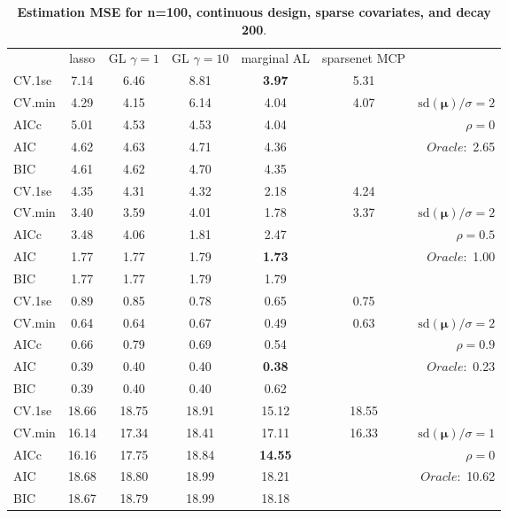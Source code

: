 \begin{table}\vspace{-.5cm}
\caption[l]{ { \bf Estimation MSE for n=100, continuous design, 
sparse covariates, and  decay  200}.}
\vspace{-.5cm}
\footnotesize{}
\begin{center}
\begin{tabular}{l*{5}{c}|r}
& lasso & GL $\gamma=1$ & GL $\gamma=10$ & marginal AL & sparsenet MCP  & \\
 \cline{1-7}
CV.1se & 7.14 & 6.46 & 8.81 & {\bf 3.97} & 5.31 & \\
CV.min & 4.29 & 4.15 & 6.14 & 4.04 & 4.07 &  $\mathrm{sd}(\mathbf{\mu})/\sigma=2$ \\
AICc & 5.01 & 4.53 & 4.53 & 4.04 & & $\rho=0$ \\
AIC & 4.62 & 4.63 & 4.71 & 4.36 & &  \multirow{2}{*}{$Oracle: $ 2.65} \\
BIC & 4.61 & 4.62 & 4.70 & 4.35 & &  \\
 \hline 
CV.1se & 4.35 & 4.31 & 4.32 & 2.18 & 4.24 & \\
CV.min & 3.40 & 3.59 & 4.01 & 1.78 & 3.37 &  $\mathrm{sd}(\mathbf{\mu})/\sigma=2$ \\
AICc & 3.48 & 4.06 & 1.81 & 2.47 & & $\rho=0.5$ \\
AIC & 1.77 & 1.77 & 1.79 & {\bf 1.73} & &  \multirow{2}{*}{$Oracle: $ 1.00} \\
BIC & 1.77 & 1.77 & 1.79 & 1.79 & &  \\
 \hline 
CV.1se & 0.89 & 0.85 & 0.78 & 0.65 & 0.75 & \\
CV.min & 0.64 & 0.64 & 0.67 & 0.49 & 0.63 &  $\mathrm{sd}(\mathbf{\mu})/\sigma=2$ \\
AICc & 0.66 & 0.79 & 0.69 & 0.54 & & $\rho=0.9$ \\
AIC & 0.39 & 0.40 & 0.40 & {\bf 0.38} & &  \multirow{2}{*}{$Oracle: $ 0.23} \\
BIC & 0.39 & 0.40 & 0.40 & 0.62 & &  \\
 \hline 
CV.1se & 18.66 & 18.75 & 18.91 & 15.12 & 18.55 & \\
CV.min & 16.14 & 17.34 & 18.41 & 17.11 & 16.33 &  $\mathrm{sd}(\mathbf{\mu})/\sigma=1$ \\
AICc & 16.16 & 17.75 & 18.84 & {\bf 14.55} & & $\rho=0$ \\
AIC & 18.68 & 18.80 & 18.99 & 18.21 & &  \multirow{2}{*}{$Oracle: $ 10.62} \\
BIC & 18.67 & 18.79 & 18.99 & 18.18 & &  \\

\end{tabular}
\end{center}
\end{table}
